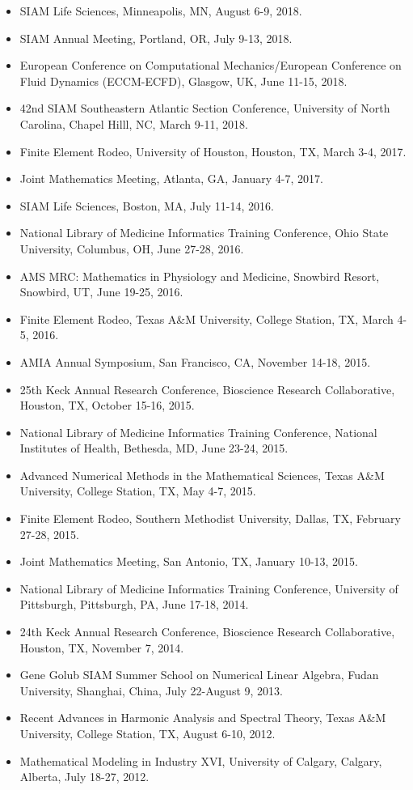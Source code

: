 \documentclass{article} %
\begin{document}
\begin{itemize}
\item SIAM Life Sciences, Minneapolis, MN, August 6-9, 2018.
\item SIAM Annual Meeting, Portland, OR, July 9-13, 2018.
\item European Conference on Computational Mechanics/European Conference on Fluid Dynamics (ECCM-ECFD), Glasgow, UK, June 11-15, 2018.
\item 42nd SIAM Southeastern Atlantic Section Conference, University of North Carolina, Chapel Hilll, NC, March 9-11, 2018.
\item Finite Element Rodeo, University of Houston, Houston, TX, March 3-4, 2017.
\item Joint Mathematics Meeting, Atlanta, GA, January 4-7, 2017.
\item SIAM Life Sciences, Boston, MA, July 11-14, 2016.
\item National Library of Medicine Informatics Training Conference, Ohio State University, Columbus, OH, June 27-28, 2016.
\item AMS MRC: Mathematics in Physiology and Medicine, Snowbird Resort, Snowbird, UT, June 19-25, 2016.
\item Finite Element Rodeo, Texas A\&M University, College Station, TX, March 4-5, 2016.
\item AMIA Annual Symposium, San Francisco, CA, November 14-18, 2015.
\item 25th Keck Annual Research Conference, Bioscience Research Collaborative, Houston, TX, October 15-16, 2015.
\item National Library of Medicine Informatics Training Conference, National Institutes of Health, Bethesda, MD, June 23-24, 2015.
\item Advanced Numerical Methods in the Mathematical Sciences, Texas A\&M University, College Station, TX, May 4-7, 2015.
\item Finite Element Rodeo, Southern Methodist University, Dallas, TX,
 February 27-28, 2015.
\item Joint Mathematics Meeting, San Antonio, TX, January 10-13, 2015. 
\item National Library of Medicine Informatics Training Conference, University of Pittsburgh, Pittsburgh, PA, June 17-18, 2014.
\item 24th Keck Annual Research Conference, Bioscience Research Collaborative, Houston, TX, November 7, 2014.
\item Gene Golub SIAM Summer School on Numerical Linear Algebra, Fudan University, Shanghai, China, July 22-August 9, 2013.
\item Recent Advances in Harmonic Analysis and Spectral Theory, Texas A\&M University, College Station, TX, August 6-10, 2012.
\item Mathematical Modeling in Industry XVI, University of Calgary, Calgary, Alberta, July 18-27, 2012.
\end{itemize}







\end{document}
